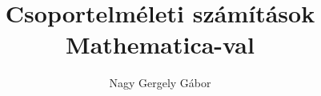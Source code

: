 \author{Nagy Gergely Gábor}
\title{Csoportelméleti számítások Mathematica-val}
\maketitle
\clearpage
